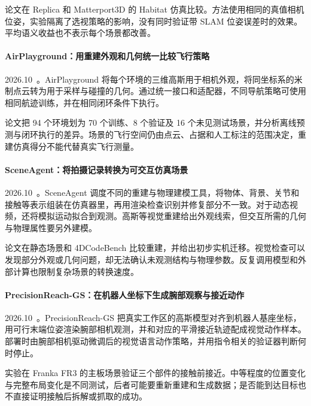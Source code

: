 论文在 Replica 和 Matterport3D 的 Habitat 仿真比较。方法使用相同的真值相机位姿，实验隔离了选视策略的影响，没有同时验证带 SLAM 位姿误差时的效果。平均语义收益也不表示每个场景都改善。

\paragraph{AirPlayground：用重建外观和几何统一比较飞行策略}
2026.10~\cite{2610_29699}。AirPlayground 将每个环境的三维高斯用于相机外观，将同坐标系的米制点云转为用于采样与碰撞的几何。通过统一接口和适配器，不同导航策略可使用相同航迹训练，并在相同闭环条件下执行。

论文把 94 个环境划为 70 个训练、8 个验证及 16 个未见测试场景，并分析离线预测与闭环执行的差异。场景的飞行空间仍由点云、占据和人工标注的范围决定，重建仿真得分不能代替真实飞行测量。

\paragraph{SceneAgent：将拍摄记录转换为可交互仿真场景}
2026.10~\cite{2610_34745}。SceneAgent 调度不同的重建与物理建模工具，将物体、背景、关节和接触等表示组装在仿真器里，再用渲染检查识别并修复部分不一致。对于动态视频，还将模拟运动拟合到观测。高斯等视觉重建给出外观线索，但交互所需的几何与物理属性要另外建模。

论文在静态场景和 4DCodeBench 比较重建，并给出初步实机迁移。视觉检查可以发现部分外观或几何问题，却无法确认未观测结构与物理参数。反复调用模型和外部计算也限制复杂场景的转换速度。

\paragraph{PrecisionReach-GS：在机器人坐标下生成腕部观察与接近动作}
2026.10~\cite{2610_35626}。PrecisionReach-GS 把真实工作区的高斯模型对齐到机器人基座坐标，用可行末端位姿渲染腕部相机观测，并和对应的平滑接近轨迹配成视觉动作样本。部署时由腕部相机驱动微调后的视觉语言动作策略，并用指令相关的验证器判断何时停止。

实验在 Franka FR3 的主板场景验证三个部件的接触前接近。中等程度的位置变化与完整布局变化是不同测试，后者可能要重新重建和生成数据；是否能到达目标也不直接证明接触后拆解或抓取的成功。
